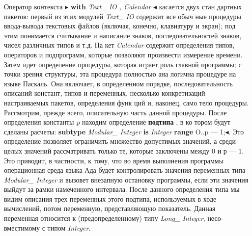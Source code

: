 Оператор контекста  $\blacktriangleright$ {\bf with} {\it Text\_ IO , Calendar} $\blacktriangleleft$ касается двух стан­
дартных пакетов: первый из этих модулей {\it Text\_ IO} содержит все обыч­
ные процедуры ввода-вывода текстовых файлов (включая, конечно,
клавиатуру и экран); под этим понимается считывание и написание
знаков, последовательностей знаков, чисел различных типов и т.д. Па­
кет {\it Calendar} содержит определения типов, операторов и подпрограмм,
которые позволяют произвести измерение времени.
Затем идет определение процедуры, которая играет роль главной
программы; с точки зрения структуры, эта процедура полностью ана­
логична процедуре на языке Паскаль. Она включает, в определенном
порядке, последовательность описаний констант, типов и переменных,
несколько конкретизаций настраиваемых пакетов, определения функ­
ций и, наконец, само тело процедуры.
Рассмотрим, прежде всего, описательную часть данной процедуры.
После определения константы {\it p} находим определение {\bf подтипа} , в ко­
тором будут сделаны расчеты:  {\bf subtype} {\it Modular\_ Integer} {\bf is} {\it Integer} {\bf range} O..p — 1;$\blacktriangleleft$. 
Это определение позволяет ограничить множество
допустимых значений, а среди целых значений рассматривать только
те, которые заключены между 0 и р — 1. Это приводит, в частности, к
тому, что во время выполнения программы операционная среда языка
Ада будет контролировать значения переменных типа {\it Modular\_ Integer}
и вызовет внезапную остановку программы, если эти значения выйдут
за рамки намеченного интервала. После данного определения типа мы
видим описания трех переменных этого подтипа, используемых в ходе
вычислений, потом переменную, представляющую показатель. Данная
переменная относится к (предопределенному) типу {\it Long\_ Integer}, несо­
вместимому с типом {\it Integer}.

